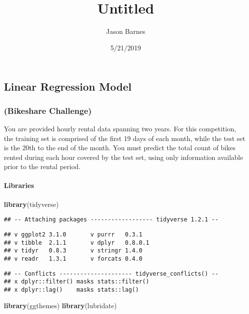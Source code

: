 \documentclass[]{article}
\title{Untitled}
\author{Jason Barnes}
\date{5/21/2019}
\newenvironment{Shaded}{\begin{snugshade}}{\end{snugshade}}
\newcommand{\KeywordTok}[1]{\textcolor[rgb]{0.13,0.29,0.53}{\textbf{#1}}}
\newcommand{\NormalTok}[1]{#1}
\let\oldparagraph\paragraph
\renewcommand{\paragraph}[1]{\oldparagraph{#1}\mbox{}}
\begin{document}
\maketitle

\subsection{Linear Regression Model}\label{linear-regression-model}

\subsubsection{(Bikeshare Challenge)}\label{bikeshare-challenge}

You are provided hourly rental data spanning two years. For this
competition, the training set is comprised of the first 19 days of each
month, while the test set is the 20th to the end of the month. You must
predict the total count of bikes rented during each hour covered by the
test set, using only information available prior to the rental period.

\paragraph{Libraries}\label{libraries}

\begin{Shaded}
\begin{Highlighting}[]
\KeywordTok{library}\NormalTok{(tidyverse)}
\end{Highlighting}
\end{Shaded}

\begin{verbatim}
## -- Attaching packages ------------------ tidyverse 1.2.1 --
\end{verbatim}

\begin{verbatim}
## v ggplot2 3.1.0       v purrr   0.3.1  
## v tibble  2.1.1       v dplyr   0.8.0.1
## v tidyr   0.8.3       v stringr 1.4.0  
## v readr   1.3.1       v forcats 0.4.0
\end{verbatim}

\begin{verbatim}
## -- Conflicts --------------------- tidyverse_conflicts() --
## x dplyr::filter() masks stats::filter()
## x dplyr::lag()    masks stats::lag()
\end{verbatim}

\begin{Shaded}
\begin{Highlighting}[]
\KeywordTok{library}\NormalTok{(ggthemes)}
\KeywordTok{library}\NormalTok{(lubridate)}
\end{Highlighting}
\end{Shaded}
\end{document}
